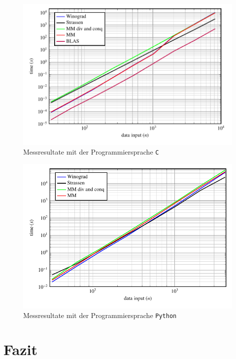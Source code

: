 \begin{figure}
	\center
	\includegraphics[width=\linewidth]{papers/multiplikation/images/meas_c}
	\caption{Messresultate mit der Programmiersprache \texttt{C}}
	\label{multiplikation:fig:c_meas_4096}
\end{figure}


\begin{figure}
	\center
	\includegraphics[width=\linewidth]{papers/multiplikation/images/meas_python}
	\caption{Messresultate mit der Programmiersprache \texttt{Python}}
	\label{multiplikation:fig:python}
\end{figure}

\section{Fazit}

